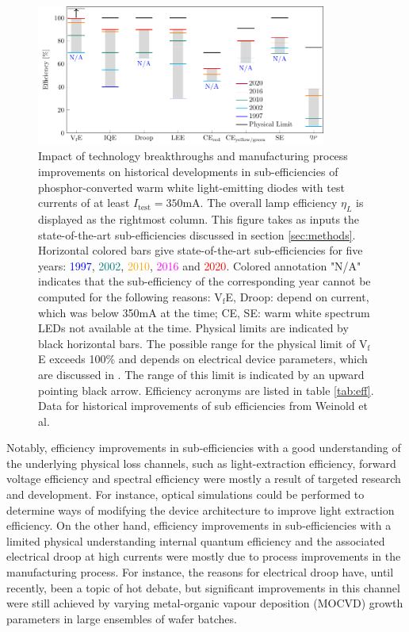 \documentclass[a4paper,nocompress]{spie}  %
\begin{document}
    \begin{figure} [ht]
        \begin{center}
            \includegraphics[width=0.85\textwidth]{SPIE/article/breakthroughs_efficiency.pdf}
        \end{center}
        \caption{Impact of technology breakthroughs and manufacturing process improvements on historical developments in sub-efficiencies of phosphor-converted warm white light-emitting diodes with test currents of at least $I_\text{test}=350$mA. The overall lamp efficiency $\eta_L$ is displayed as the rightmost column. This figure takes as inputs the state-of-the-art sub-efficiencies discussed in section \ref{sec:methods}. Horizontal colored bars give state-of-the-art sub-efficiencies for five years: \textcolor{blue}{1997}, \textcolor{teal}{2002}, \textcolor{orange}{2010}, \textcolor{magenta}{2016} and \textcolor{red}{2020}. Colored annotation "N/A" indicates that the sub-efficiency of the corresponding year cannot be computed for the following reasons: V$_\text{f}$E, Droop: depend on current, which was below 350mA at the time; CE, SE: warm white spectrum LEDs not available at the time. Physical limits are indicated by black horizontal bars. The possible range for the physical limit of V$_\text{f}$E exceeds 100\% and depends on electrical device parameters, which are discussed in \cite{david2016electrical}. The range of this limit is indicated by an upward pointing black arrow. Efficiency acronyms are listed in table \ref{tab:eff}. Data for historical improvements of sub efficiencies from Weinold et al. \cite{weinold2020technology}}
        \label{fig:efficiency}
    \end{figure}
    
    Notably, efficiency improvements in sub-efficiencies with a good understanding of the underlying physical loss channels, such as light-extraction efficiency, forward voltage efficiency and spectral efficiency were mostly a result of targeted research and development. For instance, optical simulations could be performed to determine ways of modifying the device architecture to improve light extraction efficiency. On the other hand, efficiency improvements in sub-efficiencies with a limited physical understanding internal quantum efficiency and the associated electrical droop at high currents were mostly due to process improvements in the manufacturing process. For instance, the reasons for electrical droop have, until recently, been a topic of hot debate, but significant improvements in this channel were still achieved by varying metal-organic vapour deposition (MOCVD) growth parameters in large ensembles of wafer batches.
\end{document}
